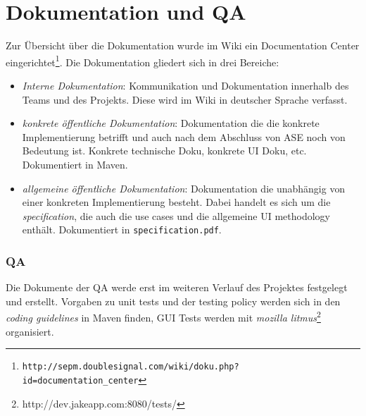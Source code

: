\section{Dokumentation und QA}
Zur Übersicht über die Dokumentation wurde im Wiki ein Documentation Center
eingerichtet\footnote{\texttt{http://sepm.doublesignal.com/wiki/doku.php?id=documentation\_center}}.
Die Dokumentation gliedert sich in drei Bereiche:

\begin{itemize}
\item \emph{Interne Dokumentation}: Kommunikation und Dokumentation innerhalb
des Teams und des Projekts. Diese wird im Wiki in deutscher Sprache verfasst.
\item \emph{konkrete öffentliche Dokumentation}: Dokumentation die die konkrete
Implementierung betrifft und auch nach dem Abschluss von ASE noch von Bedeutung
ist. Konkrete technische Doku, konkrete UI Doku, etc. Dokumentiert in Maven.
\item \emph{allgemeine öffentliche Dokumentation}: Dokumentation die unabhängig
von einer konkreten Implementierung besteht. Dabei handelt es sich um die \emph
{specification}, die auch die use cases und die allgemeine UI methodology
enthält. Dokumentiert in \texttt{specification.pdf}.
\end{itemize}

\subsubsection{QA}
Die Dokumente der QA werde erst im weiteren Verlauf des Projektes festgelegt
und erstellt. Vorgaben zu unit tests und der testing policy werden sich in den
\emph{coding guidelines} in Maven finden, GUI Tests werden mit \emph{mozilla
litmus}\footnote{http://dev.jakeapp.com:8080/tests/} organisiert.

